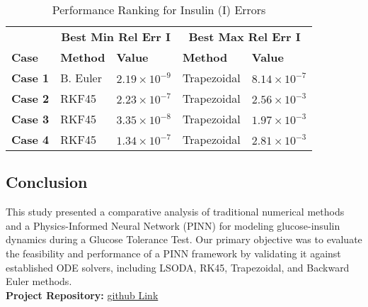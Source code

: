 \documentclass[conference]{IEEEtran}
\begin{document}
\vspace{-0.7cm}
\begin{table}[H]
\caption{Performance Ranking for Insulin (I) Errors}
\centering
\begin{tabular}{@{}l l l l l@{}}
\toprule
& \multicolumn{2}{c}{\textbf{Best Min Rel Err I}} & \multicolumn{2}{c}{\textbf{Best Max Rel Err I}} \\
\cmidrule(lr){2-3} \cmidrule(lr){4-5}
\textbf{Case} & \textbf{Method} & \textbf{Value} & \textbf{Method} & \textbf{Value} \\
\midrule
\textbf{Case 1} & B. Euler & $2.19 \times 10^{-9}$ & Trapezoidal & $8.14 \times 10^{-7}$ \\
\textbf{Case 2} & RKF45 & $2.23 \times 10^{-7}$ & Trapezoidal & $2.56 \times 10^{-3}$ \\
\textbf{Case 3} & RKF45 & $3.35 \times 10^{-8}$ & Trapezoidal & $1.97 \times 10^{-3}$ \\
\textbf{Case 4} & RKF45 & $1.34 \times 10^{-7}$ & Trapezoidal & $2.81 \times 10^{-3}$ \\
\bottomrule
\end{tabular}
\label{tab:insulin_comparison}
\end{table}

\subsection{Conclusion}

This study presented a comparative analysis of traditional numerical methods and a Physics-Informed Neural Network (PINN) for modeling glucose-insulin dynamics during a Glucose Tolerance Test. Our primary objective was to evaluate the feasibility and performance of a PINN framework by validating it against established ODE solvers, including LSODA, RK45, Trapezoidal, and Backward Euler methods.\\
\noindent
\textbf{Project Repository:} \href{https://github.com/Ibrahim-Abdelqader/ML-Numerical-Diabetes-Glucose-ODE-Modeling}{github Link}
\end{document}
